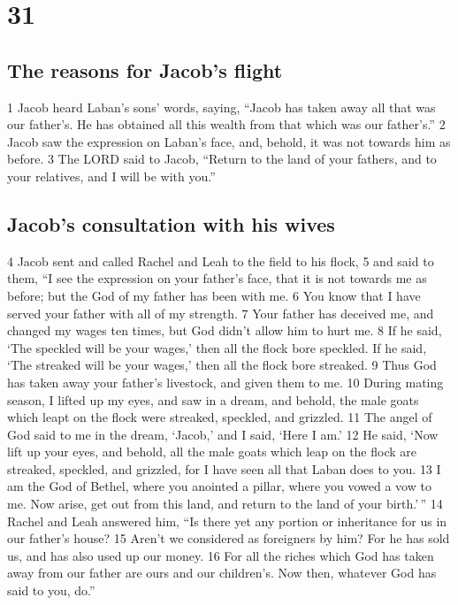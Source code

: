 \hypertarget{section-30}{%
\section{31}\label{section-30}}

\hypertarget{the-reasons-for-jacobs-flight}{%
\subsection{The reasons for Jacob's
flight}\label{the-reasons-for-jacobs-flight}}

{1} Jacob heard Laban's sons' words, saying, ``Jacob has taken away all
that was our father's. He has obtained all this wealth from that which
was our father's.'' {2} Jacob saw the expression on Laban's face, and,
behold, it was not towards him as before. {3} The LORD said to Jacob,
``Return to the land of your fathers, and to your relatives, and I will
be with you.''

\hypertarget{jacobs-consultation-with-his-wives}{%
\subsection{Jacob's consultation with his
wives}\label{jacobs-consultation-with-his-wives}}

{4} Jacob sent and called Rachel and Leah to the field to his flock, {5}
and said to them, ``I see the expression on your father's face, that it
is not towards me as before; but the God of my father has been with me.
{6} You know that I have served your father with all of my strength. {7}
Your father has deceived me, and changed my wages ten times, but God
didn't allow him to hurt me. {8} If he said, `The speckled will be your
wages,' then all the flock bore speckled. If he said, `The streaked will
be your wages,' then all the flock bore streaked. {9} Thus God has taken
away your father's livestock, and given them to me. {10} During mating
season, I lifted up my eyes, and saw in a dream, and behold, the male
goats which leapt on the flock were streaked, speckled, and grizzled.
{11} The angel of God said to me in the dream, `Jacob,' and I said,
`Here I am.' {12} He said, `Now lift up your eyes, and behold, all the
male goats which leap on the flock are streaked, speckled, and grizzled,
for I have seen all that Laban does to you. {13} I am the God of Bethel,
where you anointed a pillar, where you vowed a vow to me. Now arise, get
out from this land, and return to the land of your birth.'\,'' {14}
Rachel and Leah answered him, ``Is there yet any portion or inheritance
for us in our father's house? {15} Aren't we considered as foreigners by
him? For he has sold us, and has also used up our money. {16} For all
the riches which God has taken away from our father are ours and our
children's. Now then, whatever God has said to you, do.''

